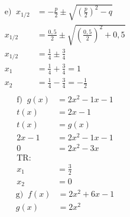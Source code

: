 \documentclass[a4paper]{article}
\begin{document}
	\begin{figure}
		\begin{minipage}{0\textwidth}
			\begin{align*}
				\text{e)	}\
				x_{1/2} &= -\frac{p}{2} \pm\sqrt{(\frac{p}{2})^{2} - q} \\
				x_{1/2} &= \frac{0,5}{2} \pm\sqrt{(\frac{0,5}{2})^{2} + 0,5} \\
				x_{1/2} &= \frac{1}{4} \pm \frac{3}{4} \\
				x_{1} &= \frac{1}{4} + \frac{3}{4} = 1 \\
				x_{2} &= \frac{1}{4} - \frac{3}{4} = -\frac{1}{2} \\
			\end{align*}
			\begin{align*}
				\text{f)	}\
				g(x) &= 2x^{2} - 1x - 1 \\
				t(x) &= 2x - 1 \\
				t(x)&= g(x) \\
				2x - 1&=2x^{2} - 1x - 1 \\
				0 &= 2x^{2} - 3x \\
				\text{TR: } \\
				x_{1} &= \frac{3}{2} \\
				x_{2} &= 0 
			\end{align*}
			\begin{align*}
				\text{g)	}\
				f(x) &= 2x^{2} + 6x - 1 \\
				g(x) &= 2x^{2} \\
			\end{align*}
				 \\
				 \\
		\end{minipage}
	\end{figure}
\clearpage
\newpage
\end{document}
